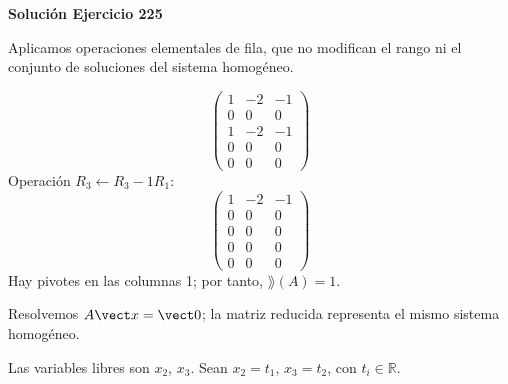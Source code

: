 \par\bigskip\noindent\textbf{Solución Ejercicio 225}\par\nobreak
Aplicamos operaciones elementales de fila, que no modifican el rango ni el conjunto de soluciones del sistema homogéneo.

\[
\begin{pmatrix}1&-2&-1\\0&0&0\\1&-2&-1\\0&0&0\\0&0&0\end{pmatrix}
\]
Operación $R_{3}\leftarrow R_{3}-1R_{1}$:
\[
\begin{pmatrix}1&-2&-1\\0&0&0\\0&0&0\\0&0&0\\0&0&0\end{pmatrix}
\]
Hay pivotes en las columnas 1; por tanto, $\boxed{\rang(A)=1}$.

Resolvemos $A\vect x=\vect0$; la matriz reducida representa el mismo sistema homogéneo.

Las variables libres son $x_{2}$, $x_{3}$. Sean $x_{2}=t_{1}$, $x_{3}=t_{2}$, con $t_i\in\mathbb R$.

